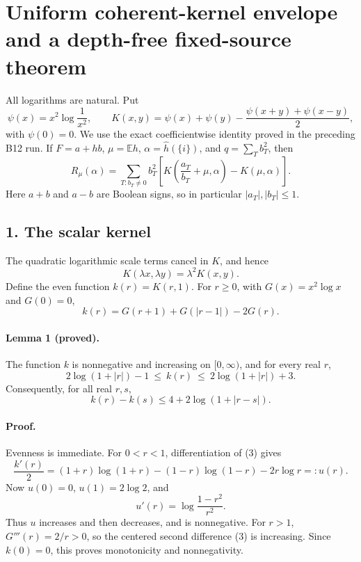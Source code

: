 \section*{Uniform coherent-kernel envelope and a depth-free fixed-source theorem}

All logarithms are natural.  Put
\[
 \psi(x)=x^2\log\frac1{x^2},\qquad
 K(x,y)=\psi(x)+\psi(y)-\frac{\psi(x+y)+\psi(x-y)}2,
\]
with \(\psi(0)=0\).  We use the exact coefficientwise identity proved in
the preceding B12 run.  If \(F=a+h b\), \(\mu=\mathbb Eh\),
\(\alpha=\widehat h(\{i\})\), and \(q=\sum_Tb_T^2\), then
\[
 R_\mu(\alpha)=\sum_{T:b_T\ne0}b_T^2
 \left[K\left(\frac{a_T}{b_T}+\mu,\alpha\right)-K(\mu,\alpha)\right].       \tag{1}
\]
Here \(a+b\) and \(a-b\) are Boolean signs, so in particular
\(|a_T|,|b_T|\le1\).

\subsection*{1. The scalar kernel}

The quadratic logarithmic scale terms cancel in \(K\), and hence
\[
 K(\lambda x,\lambda y)=\lambda^2K(x,y).                              \tag{2}
\]
Define the even function \(k(r)=K(r,1)\).  For \(r\ge0\), with
\(G(x)=x^2\log x\) and \(G(0)=0\),
\[
 k(r)=G(r+1)+G(|r-1|)-2G(r).                                          \tag{3}
\]

\paragraph{Lemma 1 (proved).}
The function \(k\) is nonnegative and increasing on \([0,\infty)\), and
for every real \(r\),
\[
 2\log(1+|r|)-1\ \le\ k(r)\ \le\ 2\log(1+|r|)+3.                    \tag{4}
\]
Consequently, for all real \(r,s\),
\[
 k(r)-k(s)\le4+2\log(1+|r-s|).                                      \tag{5}
\]

\paragraph{Proof.}
Evenness is immediate.  For \(0<r<1\), differentiation of (3) gives
\[
 \frac{k'(r)}2=(1+r)\log(1+r)-(1-r)\log(1-r)-2r\log r=:u(r).
\]
Now \(u(0)=0\), \(u(1)=2\log2\), and
\[
 u'(r)=\log\frac{1-r^2}{r^2}.
\]
Thus \(u\) increases and then decreases, and is nonnegative.  For
\(r>1\), \(G'''(r)=2/r>0\), so the centered second difference (3) is
increasing.  Since \(k(0)=0\), this proves monotonicity and
nonnegativity.

